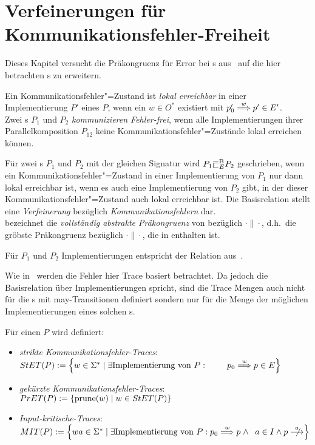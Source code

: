 \chapter{Verfeinerungen für Kommunikationsfehler-Freiheit}

Dieses Kapitel versucht die Präkongruenz für Error bei \EIO{}s
aus~\cite{Schinko2016BA} auf die hier betrachten \MEIO{}s zu erweitern.

\begin{Def}
  Ein Kommunikationsfehler"=Zustand ist \emph{lokal erreichbar} in einer
  Implementierung $P'$ eines \MEIO{} $P$, wenn ein $w\in O^*$ existiert mit
  $p'_0 \weakmust[w]p'\in E'$.\\
  Zwei \MEIO{}s $P_1$ und $P_2$ \emph{kommunizieren Fehler-frei}, wenn alle
  Implementierungen ihrer Parallelkomposition $P_{12}$ keine
  Kommunikationsfehler"=Zustände lokal erreichen können.
\end{Def}

\begin{Def}
  Für zwei \MEIO{}s $P_1$ und $P_2$ mit der gleichen Signatur wird $P_1\EBRel{} P_2$
  geschrieben, wenn ein Kommunikationsfehler"=Zustand in einer Implementierung
  von $P_1$ nur dann lokal erreichbar ist, wenn es auch eine Implementierung
  von $P_2$ gibt, in der dieser Kommunikationsfehler"=Zustand auch lokal
  erreichbar ist. Die Basisrelation stellt eine \emph{Verfeinerung} bezüglich
  \emph{Kommunikationsfehlern} dar.\\
  \ECRel{} bezeichnet die \emph{vollständig abstrakte Präkongruenz} von
  \EBRel{} bezüglich $\cdot\|\cdot$, d.h.\ die gröbste Präkongruenz bezüglich
  $\cdot\|\cdot$, die in \EBRel{} enthalten ist.
\end{Def}

Für $P_1$ und $P_2$ Implementierungen entspricht \EBRel{} der Relation
\EBbaRel{} aus~\cite{Schinko2016BA}.

Wie in~\cite{Schinko2016BA} werden die Fehler hier Trace basiert betrachtet. Da
jedoch die Basisrelation über Implementierungen spricht, sind die Trace Mengen
auch nicht für die \MEIO{}s mit may-Transitionen definiert sondern nur für die
Menge der möglichen Implementierungen eines solchen \MEIO{}s.

\begin{Def}
  Für einen \MEIO{} $P$ wird definiert:
  \begin{itemize}
    \item \emph{strikte Kommunikationsfehler-Traces}: $\StET (P) := \left\{w\in\Sigma
      ^* \mid \exists \text{Implementierung von } P: \phantom{\weakmust[w]}
      \right.$ $\left.p_0 \weakmust[w] p \in E\right\}$
    \item \emph{gekürzte Kommunikationsfehler-Traces}: $PrET (P) := \left\{\mathrm{prune} (w)
      \mid w\in StET (P)\right\}$
    \item \emph{Input-kritische-Traces}: $\MIT (P) := \left\{wa\in\Sigma ^* \mid
      \exists \text{Implementierung von } P : p_0 \weakmust[w] p \;\land
      \right.$ $\left. a\in I\land p\nmust[a] \right\}$
  \end{itemize}
\end{Def}

